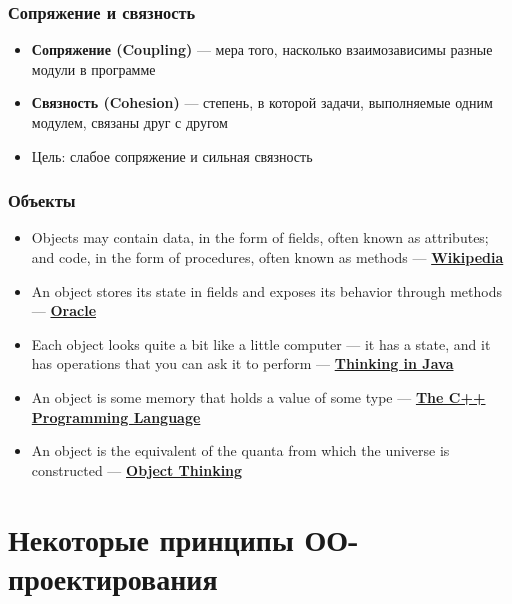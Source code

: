 \documentclass[xetex,mathserif,serif]{beamer}
\begin{document}
	\begin{frame}
		\frametitle{Сопряжение и связность}
		\begin{itemize}
			\item \textbf{Сопряжение (Coupling)} --- мера того, насколько взаимозависимы разные модули в программе
			\item \textbf{Связность (Cohesion)} --- степень, в которой задачи, выполняемые одним модулем, связаны друг с другом
			\item Цель: слабое сопряжение и сильная связность
		\end{itemize}
	\end{frame}

	\begin{frame}
		\frametitle{Объекты}
		\begin{itemize}
			\item Objects may contain data, in the form of fields, often known as attributes; and code, in the form of procedures, often known as methods --- \textbf{\href{https://en.wikipedia.org/wiki/Object-oriented\_programming}{Wikipedia}}
			\item An object stores its state in fields and exposes its behavior through methods --- \textbf{\href{https://docs.oracle.com/javase/tutorial/java/concepts/object.html}{Oracle}}
			\item Each object looks quite a bit like a little computer --- it has a state, and it has operations that you can ask it to perform --- \textbf{\href{http://amzn.to/1PBmQpm}{Thinking in Java}}
			\item An object is some memory that holds a value of some type --- \textbf{\href{http://amzn.to/1XyGCtk}{The C++ Programming Language}}
			\item An object is the equivalent of the quanta from which the universe is constructed --- \textbf{\href{http://amzn.to/266oJr4}{Object Thinking}}
		\end{itemize}
	\end{frame}

	\section{Некоторые принципы ОО-проектирования}
\end{document}
